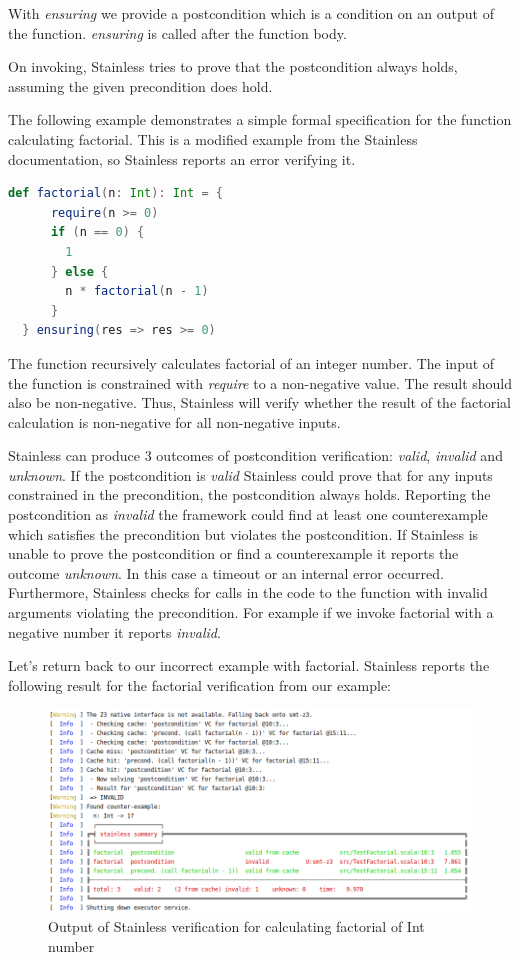 With \textit{ensuring} we provide a postcondition which is a condition on an output of the function.
\textit{ensuring} is called after the function body.

On invoking, Stainless tries to prove that the postcondition always holds, assuming the given precondition does hold.\cite{Stainless:introduction}

The following example demonstrates a simple formal specification for the function calculating factorial.
This is a modified example from the Stainless documentation, so Stainless reports an error verifying it.
\begin{lstlisting}[language=Scala]
  def factorial(n: Int): Int = {
      require(n >= 0)
      if (n == 0) {
        1
      } else {
        n * factorial(n - 1)
      }
  } ensuring(res => res >= 0)
\end{lstlisting}

The function recursively calculates factorial of an integer number.
The input of the function is constrained with \textit{require} to a non-negative value.
The result should also be non-negative.
Thus, Stainless will verify whether the result of the factorial calculation is non-negative for all non-negative inputs.

Stainless can produce 3 outcomes of postcondition verification: \textit{valid}, \textit{invalid} and \textit{unknown}.
If the postcondition is \textit{valid} Stainless could prove that for any inputs constrained in the precondition, the postcondition always holds.
Reporting the postcondition as \textit{invalid} the framework could find at least one counterexample which satisfies the precondition but violates the postcondition.
If Stainless is unable to prove the postcondition or find a counterexample it reports the outcome \textit{unknown}.
In this case a timeout or an internal error occurred.
Furthermore, Stainless checks for calls in the code to the function with invalid arguments violating the precondition.
For example if we invoke factorial with a negative number it reports \textit{invalid}.\cite{Stainless:introduction}

Let's return back to our incorrect example with factorial.
Stainless reports the following result for the factorial verification from our example:
\begin{figure}[H]
	\centering
		\includegraphics[scale=0.5]{images/output1.png}
	\caption{Output of Stainless verification for calculating factorial of Int number}
	\label{fig:output1}
\end{figure}

